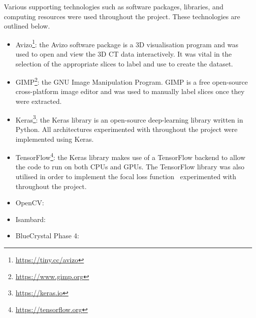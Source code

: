 Various supporting technologies such as software packages, libraries, and computing resources were used throughout the project. These technologies are outlined below.

\vspace{0.5cm} 

\begin{itemize}
\item Avizo\footnote{\url{https://tiny.cc/avizo}}: the Avizo software package is a 3D visualisation program and was used to open and view the 3D CT data interactively. It was vital in the selection of the appropriate slices to label and use to create the dataset.
\item GIMP\footnote{\url{https://www.gimp.org}}: the GNU Image Manipulation Program. GIMP is a free open-source cross-platform image editor and was used to manually label slices once they were extracted.
\item Keras\footnote{\url{https://keras.io}}: the Keras library is an open-source deep-learning library written in Python. All architectures experimented with throughout the project were implemented using Keras.
\item TensorFlow\footnote{\url{https://tensorflow.org}}: the Keras library makes use of a TensorFlow backend to allow the code to run on both CPUs and GPUs. The TensorFlow library was also utilised in order to implement the focal loss function~\cite{focalloss} experimented with throughout the project.
\item OpenCV: 
\item Isambard: 
\item BlueCrystal Phase 4:
\end{itemize}